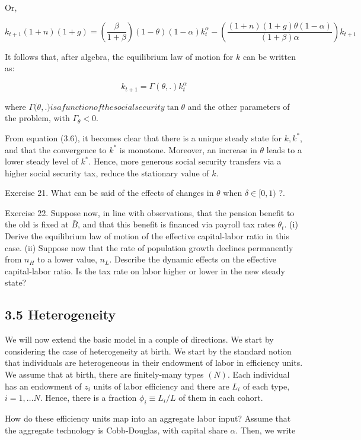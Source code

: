 \documentclass[10pt]{article}
\begin{document}
Or,

$$
k_{t+1}(1+n)(1+g)=\left(\frac{\beta}{1+\beta}\right)(1-\theta)(1-\alpha) k_{t}^{\alpha}-\left(\frac{(1+n)(1+g) \theta(1-\alpha)}{(1+\beta) \alpha}\right) k_{t+1}
$$

It follows that, after algebra, the equilibrium law of motion for $k$ can be written as:


\begin{equation*}
k_{t+1}=\Gamma(\theta, .) k_{t}^{\alpha} \tag{3.6}
\end{equation*}


where $\Gamma(\theta,$.$) is a function of the social security \tan \theta$ and the other parameters of the problem, with $\Gamma_{\theta}<0$.

From equation (3.6), it becomes clear that there is a unique steady state for $k, k^{*}$, and that the convergence to $k^{*}$ is monotone. Moreover, an increase in $\theta$ leads to a lower steady level of $k^{*}$. Hence, more generous social security transfers via a higher social security tax, reduce the stationary value of $k$.

Exercise 21. What can be said of the effects of changes in $\theta$ when $\delta \in[0,1)$ ?.

Exercise 22. Suppose now, in line with observations, that the pension benefit to the old is fixed at $\bar{B}$, and that this benefit is financed via payroll tax rates $\theta_{t}$. (i) Derive the equilibrium law of motion of the effective capital-labor ratio in this case. (ii) Suppose now that the rate of population growth declines permanently from $n_{H}$ to a lower value, $n_{L}$. Describe the dynamic effects on the effective capital-labor ratio. Is the tax rate on labor higher or lower in the new steady state?

\subsection*{3.5 Heterogeneity}
We will now extend the basic model in a couple of directions. We start by considering the case of heterogeneity at birth. We start by the standard notion that individuals are heterogeneous in their endowment of labor in efficiency units. We assume that at birth, there are finitely-many types $(N)$. Each individual has an endowment of $z_{i}$ units of labor efficiency and there are $L_{i}$ of each type, $i=1, \ldots N$. Hence, there is a fraction $\phi_{i} \equiv L_{i} / L$ of them in each cohort.

How do these efficiency units map into an aggregate labor input? Assume that the aggregate technology is Cobb-Douglas, with capital share $\alpha$. Then, we write
\end{document}
